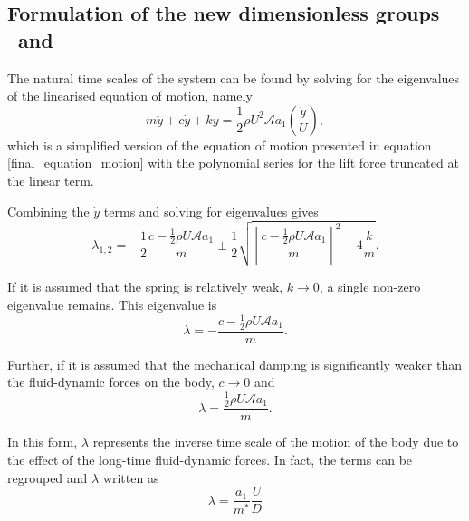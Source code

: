  \subsection{Formulation of the new dimensionless groups \massstiff \ and \massdamp}
\label{sec:newvar}
  The natural time scales of the system can be found by solving for the eigenvalues of the linearised equation of motion, namely
 \begin{equation}
 \label{eqn:eom_linear}
 m\ddot{y}{+}c\dot{y}{+}ky{=}\frac{1}{2}\rho U^2 \mathcal{A} a_1\left(\frac{\dot{y}}{U}\right),
 \end{equation}
 which is a simplified version of the equation of motion presented in equation \ref{final_equation_motion} with the polynomial series for the lift force truncated at the linear term.
 
Combining the $\dot{y}$ terms and solving for eigenvalues gives
 \begin{equation}
   \label{eqn:eigs}
   \lambda_{1,2}= -\frac{1}{2}\frac{c-\frac{1}{2}\rho U\mathcal{A}a_1}{m}\pm\frac{1}{2}\sqrt{\left[\frac{c-\frac{1}{2}\rho U\mathcal{A}a_1}{m}\right]^2-4\frac{k}{m}}.
 \end{equation}
 
If it is assumed that the spring is relatively weak, $k\rightarrow 0$, a single non-zero eigenvalue remains. This eigenvalue is
 \begin{equation}
   \label{eqn:eigs_nospring}
   \lambda=-\frac{c-\frac{1}{2}\rho U\mathcal{A}a_1}{m}.
 \end{equation}
 
Further, if it is assumed that the mechanical damping is significantly weaker than the fluid-dynamic forces on the body, $c\rightarrow 0$ and
 \begin{equation}
   \label{eqn:eigs_nospring_nodamp}
   \lambda=\frac{\frac{1}{2}\rho U\mathcal{A}a_1}{m}.
 \end{equation}
 

 In this form, $\lambda$ represents the inverse time scale of the motion of the body due to the effect of the long-time fluid-dynamic forces. In fact, the terms can be regrouped and $\lambda$ written as
 \begin{equation}
   \label{eqn:timescale}
   \lambda = \frac{a_1}{m^*}\frac{U}{D}
 \end{equation}
 
